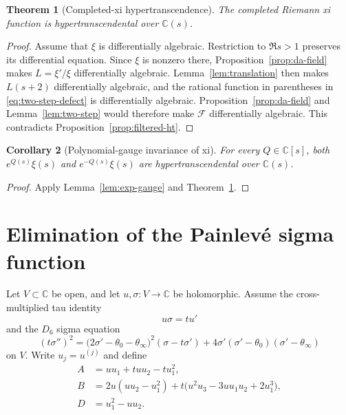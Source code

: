 \documentclass[11pt]{article}
\numberwithin{equation}{section}
\newtheorem{theorem}{Theorem}[section]
\newtheorem{corollary}[theorem]{Corollary}
\theoremstyle{definition}
\theoremstyle{remark}
\newcommand{\C}{\mathbb C}
\begin{document}
\begin{theorem}[Completed-xi hypertranscendence]
\label{thm:xi-ht}
The completed Riemann xi function is hypertranscendental over $\C(s)$.
\end{theorem}

\begin{proof}
Assume that $\xi$ is differentially algebraic.  Restriction to $\Re s>1$ preserves its
differential equation.  Since $\xi$ is nonzero there, Proposition~\ref{prop:da-field} makes
$L=\xi'/\xi$ differentially algebraic.  Lemma~\ref{lem:translation} then makes $L(s+2)$
differentially algebraic, and the rational function in parentheses in
\eqref{eq:two-step-defect} is differentially algebraic.  Proposition~\ref{prop:da-field} and
Lemma~\ref{lem:two-step} would therefore make $\mathcal F$ differentially algebraic.  This
contradicts Proposition~\ref{prop:filtered-ht}.
\end{proof}

\begin{corollary}[Polynomial-gauge invariance of xi]
\label{cor:xi-gauge}
For every $Q\in\C[s]$, both $e^{Q(s)}\xi(s)$ and $e^{-Q(s)}\xi(s)$ are
hypertranscendental over $\C(s)$.
\end{corollary}

\begin{proof}
Apply Lemma~\ref{lem:exp-gauge} and Theorem~\ref{thm:xi-ht}.
\end{proof}

\section{Elimination of the Painlev\'e sigma function}
\label{sec:tau}

Let $V\subset\C$ be open, and let $u,\sigma:V\to\C$ be holomorphic.  Assume the
cross-multiplied tau identity
\begin{equation}
 u\sigma=tu'
 \label{eq:cross-main}
\end{equation}
and the $D_6$ sigma equation
\begin{equation}
 (t\sigma'')^2
 =\bigl(2\sigma'-\theta_0-\theta_\infty\bigr)^2
      (\sigma-t\sigma')
   +4\sigma'(\sigma'-\theta_0)(\sigma'-\theta_\infty)
 \label{eq:sigma-main}
\end{equation}
on $V$.  Write $u_j=u^{(j)}$ and define
\begin{align}
 A&=uu_1+tuu_2-tu_1^2,\label{eq:A-def}\\
 B&=2u(uu_2-u_1^2)
   +t\bigl(u^2u_3-3uu_1u_2+2u_1^3\bigr),\label{eq:B-def}\\
 D&=u_1^2-uu_2.\label{eq:D-def}
\end{align}
\end{document}
